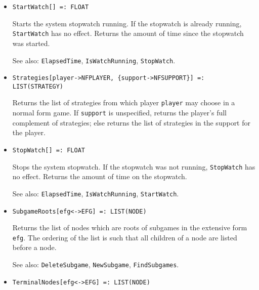 \begin{itemize}
\item
\protect \large \begin{verbatim}
StartWatch[] =: FLOAT
\end{verbatim}\normalsize

\bd
Starts the system stopwatch running.  If the stopwatch
is already running, {\tt StartWatch} has no effect.  Returns the amount
of time since the stopwatch was started.
\item
[See also:] {\tt ElapsedTime}, {\tt IsWatchRunning}, {\tt StopWatch}.
\ed

\item
\protect \large \begin{verbatim}
Strategies[player->NFPLAYER, {support->NFSUPPORT}] =: LIST(STRATEGY)
\end{verbatim}\normalsize

\bd
Returns the list of strategies from which player \verb+player+ may choose
in a normal form game.  If \verb+support+ is unspecified, returns the
player's full complement of strategies; else returns the list of strategies
in the support for the player.
\ed

\item
\protect \large \begin{verbatim}
StopWatch[] =: FLOAT
\end{verbatim}\normalsize

\bd
Stops the system stopwatch.  If the stopwatch was not
running, {\tt StopWatch} has no effect.  Returns the amount of time
on the stopwatch.
\item
[See also:] {\tt ElapsedTime}, {\tt IsWatchRunning}, {\tt StartWatch}.
\ed

\item
\protect \large \begin{verbatim}
SubgameRoots[efg<->EFG] =: LIST(NODE)
\end{verbatim}\normalsize

\bd
Returns the list of nodes which are roots of subgames in the extensive
form {\tt efg}.  The ordering of the list is such that all children
of a node are listed before a node.
\item
[See also:] {\tt DeleteSubgame}, {\tt NewSubgame}, {\tt FindSubgames}.
\ed


\item
\protect \large \begin{verbatim} 
TerminalNodes[efg<->EFG] =: LIST(NODE)
\end{verbatim}\normalsize


\end{itemize}
